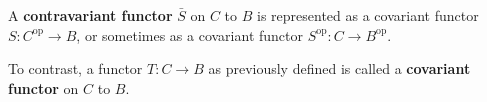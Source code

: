 A \textbf{contravariant functor} $\bar{S}$ on $C$ to $B$ is represented as a covariant functor $S: C^{\text{op}} \to B$, or sometimes as a covariant functor $S^{\text{op}}: C \to B^{\text{op}}$.

To contrast, a functor $T: C \to B$ as previously defined is called a \textbf{covariant functor} on $C$ to $B$.
